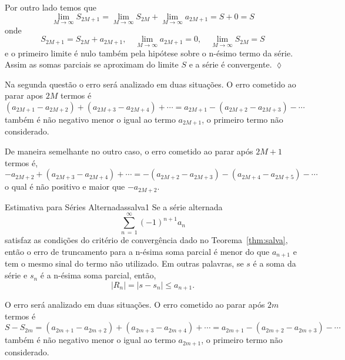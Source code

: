 Por outro lado temos que
\begin{equation*}
    \lim_{M\to\infty}S_{2M+1}=\lim_{M\to\infty}S_{2M}+\lim_{M\to\infty}a_{2M+1}=S+0=S
\end{equation*}
onde
\begin{equation*}
    S_{2M+1}=S_{2M}+a_{2M+1},\quad
    \lim_{M\to\infty}a_{2M+1}=0,\quad \lim_{M\to\infty}S_{2M}=S
\end{equation*}
e o primeiro limite \'{e} nulo tamb\'{e}m pela hip\'{o}tese sobre o n-\'{e}simo
termo da s\'{e}rie. Assim as somas parciais se aproximam do limite $S$ e
a s\'{e}rie \'{e} convergente. \hfill \(\lozenge\)

Na segunda quest\~{a}o o erro ser\'{a} analizado em duas situa\c{c}\~{o}es. O erro
cometido ao parar apos $2M$ termos  \'{e}
\begin{equation*}
    (a_{2M+1}-a_{2M+2})+(a_{2M+3}-a_{2M+4})+\cdots=a_{2M+1}-(a_{2M+2}-a_{2M+3})-\cdots
\end{equation*}
tamb\'{e}m \'{e} n\~{a}o negativo menor o igual ao termo $a_{2M+1}$, o
primeiro termo n\~{a}o considerado.

De maneira semelhante no outro caso, o erro cometido ao parar ap\'{o}s
$2M+1$ termos \'{e},
\begin{equation*}
    -a_{2M+2}+(a_{2M+3}-a_{2M+4})+\cdots=-(a_{2M+2}-a_{2M+3})-(a_{2M+4}-a_{2M+5})-\cdots
\end{equation*}
o qual \'{e} n\~{a}o positivo e maior que $-a_{2M+2}$.

\begin{theoc}{Estimativa para S\'{e}ries Alternadas}{salva1}
Se a s\'{e}rie alternada
\begin{equation*}
    \sum_{n\,=\, 1}^{\infty}(-1)^{n+1}a_{n}
\end{equation*}
satisfaz as condi\c{c}\~{o}es do crit\'{e}rio de converg\^{e}ncia dado no
Teorema~\ref{thm:salva}, ent\~{a}o o erro de truncamento para a n-\'{e}sima soma
parcial \'{e} menor do que $a_{n+1}$ e tem o mesmo sinal do termo n\~{a}o
utilizado. Em outras palavras, se $s$ \'{e} a soma da s\'{e}rie e $s_{n}$ \'{e} a
n-\'{e}sima soma parcial, ent\~{a}o,
\begin{equation*}
  |R_n|=|s-s_{n}|\leq a_{n+1}.
\end{equation*}
\end{theoc}

\prova O erro ser\'{a} analizado em duas situa\c{c}\~{o}es. O erro cometido ao
parar ap\'{o}s $2m$ termos  \'{e}
\begin{equation*}
    S-S_{2m}=(a_{2m+1}-a_{2m+2})+(a_{2m+3}-a_{2m+4})+\cdots=a_{2m+1}-(a_{2m+2}-a_{2m+3})-\cdots
\end{equation*}
tamb\'{e}m \'{e} n\~{a}o negativo menor o igual ao termo $a_{2m+1}$, o primeiro
termo n\~{a}o considerado.

